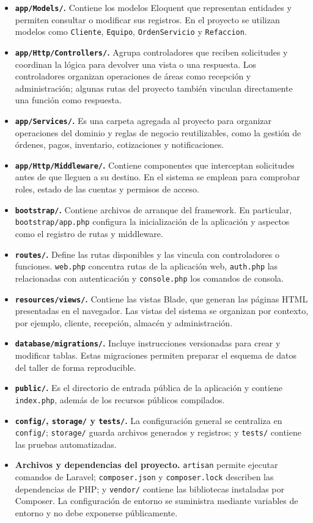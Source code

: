 \begin{itemize}
    \item \textbf{\texttt{app/Models/}.} Contiene los modelos Eloquent que representan entidades y permiten consultar o modificar sus registros. En el proyecto se utilizan modelos como \texttt{Cliente}, \texttt{Equipo}, \texttt{OrdenServicio} y \texttt{Refaccion}.
    \item \textbf{\texttt{app/Http/Controllers/}.} Agrupa controladores que reciben solicitudes y coordinan la lógica para devolver una vista o una respuesta. Los controladores organizan operaciones de áreas como recepción y administración; algunas rutas del proyecto también vinculan directamente una función como respuesta.
    \item \textbf{\texttt{app/Services/}.} Es una carpeta agregada al proyecto para organizar operaciones del dominio y reglas de negocio reutilizables, como la gestión de órdenes, pagos, inventario, cotizaciones y notificaciones.
    \item \textbf{\texttt{app/Http/Middleware/}.} Contiene componentes que interceptan solicitudes antes de que lleguen a su destino. En el sistema se emplean para comprobar roles, estado de las cuentas y permisos de acceso.
    \item \textbf{\texttt{bootstrap/}.} Contiene archivos de arranque del framework. En particular, \texttt{bootstrap/app.php} configura la inicialización de la aplicación y aspectos como el registro de rutas y middleware.
    \item \textbf{\texttt{routes/}.} Define las rutas disponibles y las vincula con controladores o funciones. \texttt{web.php} concentra rutas de la aplicación web, \texttt{auth.php} las relacionadas con autenticación y \texttt{console.php} los comandos de consola.
    \item \textbf{\texttt{resources/views/}.} Contiene las vistas Blade, que generan las páginas HTML presentadas en el navegador. Las vistas del sistema se organizan por contexto, por ejemplo, cliente, recepción, almacén y administración.
    \item \textbf{\texttt{database/migrations/}.} Incluye instrucciones versionadas para crear y modificar tablas. Estas migraciones permiten preparar el esquema de datos del taller de forma reproducible.
    \item \textbf{\texttt{public/}.} Es el directorio de entrada pública de la aplicación y contiene \texttt{index.php}, además de los recursos públicos compilados.
    \item \textbf{\texttt{config/}, \texttt{storage/} y \texttt{tests/}.} La configuración general se centraliza en \texttt{config/}; \texttt{storage/} guarda archivos generados y registros; y \texttt{tests/} contiene las pruebas automatizadas.
    \item \textbf{Archivos y dependencias del proyecto.} \texttt{artisan} permite ejecutar comandos de Laravel; \texttt{composer.json} y \texttt{composer.lock} describen las dependencias de PHP; y \texttt{vendor/} contiene las bibliotecas instaladas por Composer. La configuración de entorno se suministra mediante variables de entorno y no debe exponerse públicamente.
\end{itemize}

